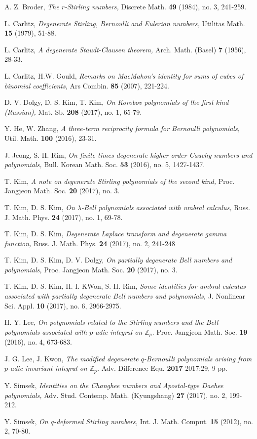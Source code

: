 \documentclass[10pt,twoside,reqno]{amsart}
\numberwithin{equation}{section}
\begin{document}
\begin{thebibliography}{0}

A. Z. Broder,
\textit{The $r$-Stirling numbers,
}Discrete Math.
{\bf{49}} (1984), no. 3, 241-259.

L. Carlitz,
\textit{Degenerate Stirling, Bernoulli and Eulerian numbers,
}Utilitas Math.
{\bf{15}} (1979), 51-88. 

L. Carlitz,
\textit{A degenerate Staudt-Clausen theorem,
}Arch. Math. (Basel)
{\bf{7}} (1956), 28-33.

L. Carlitz, H.W. Gould,
\textit{Remarks on MacMahon's identity for sums of cubes of binomial coefficients,
}Ars Combin.
{\bf{85}} (2007), 221-224.

D. V. Dolgy, D. S. Kim, T. Kim,
\textit{On Korobov polynomials of the first kind (Russian),
}Mat. Sb. 
{\bf{208}} (2017), no. 1, 65-79.

Y. He, W. Zhang, 
\textit{A three-term reciprocity formula for Bernoulli polynomials,
}Util. Math. 
{\bf{100}} (2016), 23-31.

J. Jeong, S.-H. Rim,
\textit{On finite times degenerate higher-order Cauchy numbers and polynomials,
}Bull. Korean Math. Soc.
{\bf{53}} (2016), no. 5, 1427-1437. 

T. Kim,
\textit{A note on degenerate Stirling polynomials of the second kind,
}Proc. Jangjeon Math. Soc.
{\bf{20}} (2017), no. 3.

T. Kim, D. S. Kim,
\textit{On $\lambda$-Bell polynomials associated with umbral calculus,
}Russ. J. Math. Phys.
{\bf{24}} (2017), no. 1, 69-78. 

T. Kim, D. S. Kim,
\textit{Degenerate Laplace transform and degenerate gamma function,
}Russ. J. Math. Phys.
{\bf{24}} (2017), no. 2, 241-248

T. Kim, D. S. Kim, D. V. Dolgy,
\textit{On partially degenerate Bell numbers and polynomials,
}Proc. Jangjeon Math. Soc.
{\bf{20}} (2017), no. 3.

T. Kim, D. S. Kim, H.-I. KWon, S.-H. Rim,
\textit{Some identities for umbral calculus associated with partially degenerate Bell numbers and polynomials,
}J. Nonlinear Sci. Appl.
{\bf{10}} (2017), no. 6, 2966-2975.

H. Y. Lee,
\textit{On polynomials related to the Stirling numbers and the Bell polynomials associated with $p$-adic integral on $\mathbb{Z}_p$.
}Proc. Jangjeon Math. Soc.
{\bf{19}} (2016), no. 4, 673-683.

J. G. Lee, J. Kwon, 
\textit{The modified degenerate $q$-Bernoulli polynomials arising from $p$-adic invariant integral on $\mathbb{Z}_p$.
}Adv. Difference Equ. 
{\bf{2017}} 2017:29, 9 pp.

Y. Simsek,
\textit{Identities on the Changhee numbers and Apostol-type Daehee polynomials,
}Adv. Stud. Contemp. Math. (Kyungshang)
{\bf{27}} (2017), no. 2, 199-212.

Y. Simsek,
\textit{On $q$-deformed Stirling numbers,
}Int. J. Math. Comput.
{\bf{15}} (2012), no. 2, 70-80.

\end{thebibliography}
\end{document}
